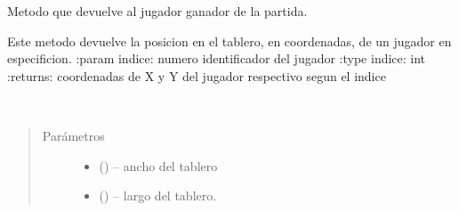 \documentclass[letterpaper,10pt,english]{sphinxmanual}
\begin{document}
\begin{fulllineitems}

\begin{fulllineitems}
\label{\detokenize{codigo:singleton.Singleton.getJugadorGanador}}
Metodo que devuelve al jugador ganador de la partida.

\end{fulllineitems}


\begin{fulllineitems}
\label{\detokenize{codigo:singleton.Singleton.getPosJugadores}}
Este metodo devuelve la posicion en el tablero, en coordenadas, de un jugador en especificion.
:param indice: numero identificador del jugador
:type indice: int
:returns: coordenadas de X y Y del jugador respectivo segun el indice

\end{fulllineitems}


\begin{fulllineitems}
\label{\detokenize{codigo:singleton.Singleton.init}}~\begin{quote}\begin{description}
\item[{Parámetros}] \leavevmode\begin{itemize}
\item {} 
 () -- ancho del tablero

\item {} 
 () -- largo del tablero.


\end{itemize}
\end{description}
\end{quote}
\end{fulllineitems}
\end{fulllineitems}
\end{document}
